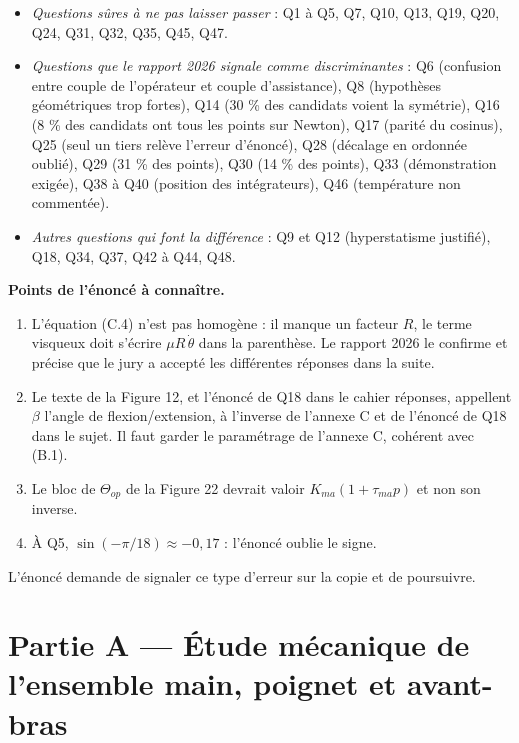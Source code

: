 \documentclass[11pt,a4paper]{article}
\providecommand{\tightlist}{\setlength{\itemsep}{0pt}\setlength{\parskip}{0pt}}
\begin{document}
\begin{itemize}
\tightlist
\item
  \emph{Questions sûres à ne pas laisser passer} : Q1 à Q5, Q7, Q10, Q13, Q19, Q20, Q24, Q31, Q32, Q35, Q45, Q47.
\item
  \emph{Questions que le rapport 2026 signale comme discriminantes} : Q6 (confusion entre couple de l'opérateur et couple d'assistance), Q8 (hypothèses géométriques trop fortes), Q14 (30 \% des candidats voient la symétrie), Q16 (8 \% des candidats ont tous les points sur Newton), Q17 (parité du cosinus), Q25 (seul un tiers relève l'erreur d'énoncé), Q28 (décalage en ordonnée oublié), Q29 (31 \% des points), Q30 (14 \% des points), Q33 (démonstration exigée), Q38 à Q40 (position des intégrateurs), Q46 (température non commentée).
\item
  \emph{Autres questions qui font la différence} : Q9 et Q12 (hyperstatisme justifié), Q18, Q34, Q37, Q42 à Q44, Q48.
\end{itemize}

\textbf{Points de l'énoncé à connaître.}

\begin{enumerate}
\def\labelenumi{\arabic{enumi}.}
\tightlist
\item
  L'équation (C.4) n'est pas homogène : il manque un facteur \(R\), le terme visqueux doit s'écrire \(\mu R\,\dot\theta\) dans la parenthèse. Le rapport 2026 le confirme et précise que le jury a accepté les différentes réponses dans la suite.
\item
  Le texte de la Figure 12, et l'énoncé de Q18 dans le cahier réponses, appellent \(\beta\) l'angle de flexion/extension, à l'inverse de l'annexe C et de l'énoncé de Q18 dans le sujet. Il faut garder le paramétrage de l'annexe C, cohérent avec (B.1).
\item
  Le bloc de \(\Theta_{op}\) de la Figure 22 devrait valoir \(K_{ma}(1+\tau_{ma}p)\) et non son inverse.
\item
  À Q5, \(\sin(-\pi/18)\approx-0{,}17\) : l'énoncé oublie le signe.
\end{enumerate}

L'énoncé demande de signaler ce type d'erreur sur la copie et de poursuivre.

\hypertarget{partie-a-uxe9tude-muxe9canique-de-lensemble-main-poignet-et-avant-bras}{%
\section{Partie A --- Étude mécanique de l'ensemble main, poignet et avant-bras}\label{partie-a-uxe9tude-muxe9canique-de-lensemble-main-poignet-et-avant-bras}}
\end{document}
